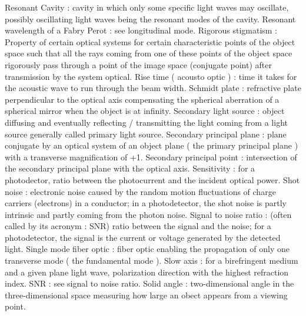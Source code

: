 Resonant Cavity                                      : cavity in which only some specific light waves may oscillate, possibly oscillating light waves being the resonant modes of the cavity.
Resonant wavelength of a Fabry Perot                 : see longitudinal mode.
Rigorous stigmatism                                  : Property of certain optical systems for certain characteristic points of the object space such that all the rays coming from one of these points of the object space rigorously pass through a point of the image space (conjugate point) after transmission by the system optical.
Rise time ( acousto optic )                          : time it takes for the acoustic wave to run through the beam width.
Schmidt plate                                        : refractive plate perpendicular to the optical axis compensating the spherical aberration of a spherical mirror when the object is at infinity.
Secondary light source                               : object diffusing and eventually reflecting / transmitting the light coming from a light source generally called primary light source.
Secondary principal plane                            : plane conjugate by an optical system of an object plane ( the primary principal plane ) with a transverse magnification of +1.
Secondary principal point                            : intersection of the secondary principal plane with the optical axis.
Sensitivity                                          : for a photodector, ratio between the photocurrent and the incident optical power.
Shot noise                                           : electronic noise caused by the random motion fluctuations of charge carriers (electrons) in a conductor; in a photodetector, the shot noise is partly intrinsic and partly coming from the photon noise.
Signal to noise ratio                                : (often called by its acronym                                   : SNR) ratio between the signal and the noise; for a photodetector, the signal is the current or voltage generated by the detected light.
Single mode fiber optic                              : fiber optic enabling the propagation of only one transverse mode ( the fundamental mode ).
Slow axis                                            : for a birefringent medium and a given plane light wave, polarization direction with the highest refraction index.
SNR                                                  : see signal to noise ratio.
Solid angle                                          : two-dimensional angle in the three-dimensional space measuring how large an obect appears from a viewing point.
